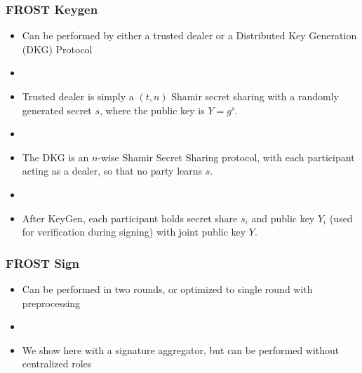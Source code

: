 \documentclass[hyperref={pdfpagelabels=true},table,dvipsnames,14pt,aspectratio=169]{beamer}
\newcommand{\random}{\overset{\$}{\leftarrow}}
\begin{document}
\begin{frame}
  \frametitle{FROST Keygen}

  \begin{itemize}
    \item<1-> Can be performed by either a trusted dealer or a Distributed Key
      Generation (DKG) Protocol
    \item[]
    \item<2-> Trusted dealer is simply a $(t,n)$ Shamir secret sharing with a randomly
      generated secret $s$, where the public key is $Y = g^s$.
    \item[]
    \item<3-> The DKG is an $n$-wise Shamir Secret Sharing protocol, with each
      participant acting as a dealer, so that no party learns $s$.
    \item[]
    \item<4> After KeyGen, each participant holds secret share $s_i$ and
      public key $Y_i$ (used for verification during signing) with joint public key $Y$.
  \end{itemize}

\end{frame}

\begin{frame}
  \frametitle{FROST Sign}

  \begin{itemize}
    \item<1-> Can be performed in two rounds, or optimized to single round with
      preprocessing
    \item[]
    \item<2-> We show here with a signature aggregator, but can be
      performed without centralized roles
  \end{itemize}
\end{frame}

\begin{frame}
  \centering
{}
\end{frame}
\end{document}
